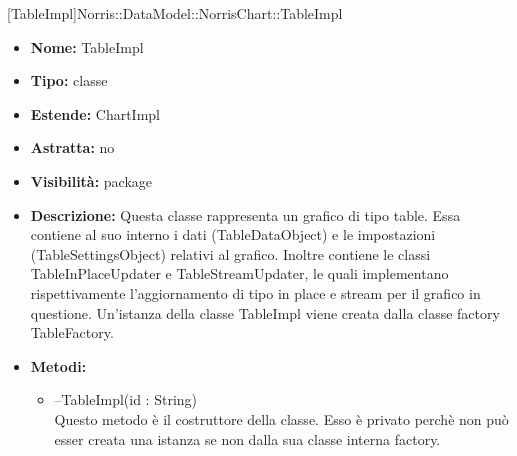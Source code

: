 			
			[TableImpl]{Norris::DataModel::NorrisChart::TableImpl}
			

	
			
			\begin{itemize}
			\item \textbf{Nome:} TableImpl
			\item \textbf{Tipo:} classe
			
		\item \textbf{Estende:}
		ChartImpl
		\item \textbf{Astratta:}
		no
			\item \textbf{Visibilità:} package
			\item \textbf{Descrizione:} Questa classe rappresenta un grafico di tipo table. Essa contiene al suo interno i dati (TableDataObject) e le impostazioni (TableSettingsObject) relativi al grafico. Inoltre contiene le classi TableInPlaceUpdater e TableStreamUpdater, le quali implementano rispettivamente l'aggiornamento di tipo in place e stream per il grafico in questione. Un'istanza della classe TableImpl viene creata dalla classe factory TableFactory.
			\item \textbf{Metodi:}
				\begin{itemize}
				\setlength{\itemsep}{5pt}
				
					\item[\ding{111}] {{--TableImpl(id : String)}} \\ [1mm] Questo metodo è il costruttore della classe. Esso è privato perchè non può esser creata una istanza se non dalla sua classe interna factory.
				\end{itemize}
		
			\end{itemize}

